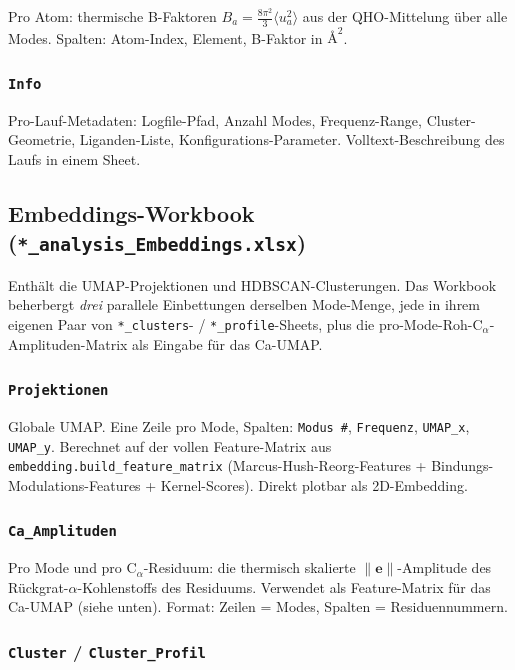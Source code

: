 \documentclass[11pt,a4paper,twoside]{article}
\providecommand{\angstrom}{\text{\AA}}    %
\newcommand{\evec}{\mathbf{e}}
\theoremstyle{remark}
\begin{document}
Pro Atom: thermische B-Faktoren $B_a = \frac{8\pi^2}{3} \langle u_a^2
\rangle$ aus der QHO-Mittelung \"uber alle Modes. Spalten: Atom-Index,
Element, B-Faktor in $\angstrom^2$.

\subsubsection*{\texttt{Info}}

Pro-Lauf-Metadaten: Logfile-Pfad, Anzahl Modes, Frequenz-Range,
Cluster-Geometrie, Liganden-Liste, Konfigurations-Parameter.
Volltext-Beschreibung des Laufs in einem Sheet.

\subsection{Embeddings-Workbook
            (\texttt{*\_analysis\_Embeddings.xlsx})}
\label{app:wb-embeddings}

Enth\"alt die UMAP-Projektionen und HDBSCAN-Clusterungen. Das
Workbook beherbergt \emph{drei} parallele Einbettungen derselben
Mode-Menge, jede in ihrem eigenen Paar von
\texttt{*\_clusters}- / \texttt{*\_profile}-Sheets, plus die
pro-Mode-Roh-C$_\alpha$-Amplituden-Matrix als Eingabe f\"ur das
Ca-UMAP.

\subsubsection*{\texttt{Projektionen}}

Globale UMAP. Eine Zeile pro Mode, Spalten: \texttt{Modus \#},
\texttt{Frequenz}, \texttt{UMAP\_x}, \texttt{UMAP\_y}. Berechnet auf
der vollen Feature-Matrix aus
\texttt{embedding.build\_feature\_matrix} (Marcus-Hush-Reorg-Features
+ Bindungs-Modulations-Features + Kernel-Scores). Direkt plotbar
als 2D-Embedding.

\subsubsection*{\texttt{Ca\_Amplituden}}

Pro Mode und pro C$_\alpha$-Residuum: die thermisch skalierte
$\lVert\evec\rVert$-Amplitude des R\"uckgrat-$\alpha$-Kohlenstoffs
des Residuums. Verwendet als Feature-Matrix f\"ur das Ca-UMAP
(siehe unten). Format: Zeilen = Modes, Spalten = Residuennummern.

\subsubsection*{\texttt{Cluster} / \texttt{Cluster\_Profil}}
\label{app:wb-embed-cluster}
\end{document}
